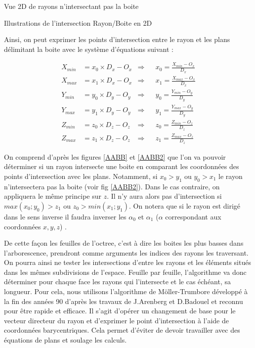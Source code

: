 \begin{figureth}
\begin{subfigureth}{0.45\textwidth}
		\caption{Vue 2D de rayons n'intersectant pas la boite}
		\label{AABB2}
	\end{subfigureth}
	\caption{Illustrations de l'intersection Rayon/Boite en 2D}
\end{figureth}

Ainsi, on peut exprimer les points d'intersection entre le rayon et les plans délimitant la boite avec le système d'équations suivant :

\begin{align}
X_{min} &= x_0 \times D_x - O_x 	& \Rightarrow 	& &	 x_0 = \frac{X_{min} - O_x}{D_x} \\
X_{max} &= x_1 \times D_x - O_x 	& \Rightarrow 	& &	x_1 = \frac{X_{max} - O_x}{D_x} \\
Y_{min} &= y_0 \times D_y - O_y 	& \Rightarrow	& &	y_0 = \frac{Y_{min} - O_y}{D_y} \\
Y_{max} &= y_1 \times D_y - O_y 	& \Rightarrow	& &	y_1 = \frac{Y_{max} - O_y}{D_y} \\
Z_{min} &= z_0 \times D_z - O_z	& \Rightarrow 	& &	z_0 = \frac{Z_{min} - O_z}{D_z} \\
Z_{max} &= z_1 \times D_z - O_z 	& \Rightarrow 	& &	z_1 = \frac{Z_{max} - O_z}{D_z} 
\end{align}

On comprend d'après les figures \ref{AABB} et \ref{AABB2} que l'on va pouvoir déterminer si un rayon intersecte une boite en comparant les coordonnées des points d'intersection avec les plans. Notamment, si $x_0 > y_1$ ou $y_0 > x_1$ le rayon n'intersectera pas la boite (voir fig \ref{AABB2}). Dans le cas contraire, on appliquera le même principe sur $z$. Il n'y aura alors pas d'intersection si $max(x_0 ; y_0) > z_1$ ou $ z_0 > min(x_1 ; y_1)$. On notera que si le rayon est dirigé dans le sens inverse il faudra inverser les $\alpha_0$ et $\alpha_1$ ($\alpha$ correspondant aux coordonnées $x,y,z$) .

De cette façon les feuilles de l'\gls{octree}, c'est à dire les boites les plus basses dans l'arborescence, prendront comme arguments les indices des rayons les traversant. On pourra ainsi ne tester les intersections d'entre les rayons et les éléments situés dans les mêmes subdivisions de l'espace. Feuille par feuille, l'algorithme va donc déterminer pour chaque face les rayons qui l'intersecte et le cas échéant, sa longueur. Pour cela, nous utilisons l'algorithme de Möller-Trumbore \cite[p. 2-3]{moller} développé à la fin des années 90 d'après les travaux de J.Arenberg \cite{arenberg} et D.Badouel \cite[p. 390-393]{badouel} et reconnu pour être rapide et efficace. Il s'agit d'opérer un changement de base pour le vecteur directeur du rayon et d'exprimer le point d'intersection à l'aide de coordonnées barycentriques. Cela permet d'éviter de devoir travailler avec des équations de plans et soulage les calculs.


